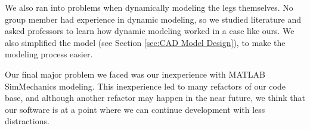 We also ran into problems when dynamically modeling the legs themselves. No group member had experience in dynamic modeling, so we studied literature and asked professors to learn how dynamic modeling worked in a case like ours. We also simplified the model (see Section \ref{sec:CAD Model Design}), to make the modeling process easier.

Our final major problem we faced was our inexperience with MATLAB SimMechanics modeling. This inexperience led to many refactors of our code base, and although another refactor may happen in the near future, we think that our software is at a point where we can continue development with less distractions.